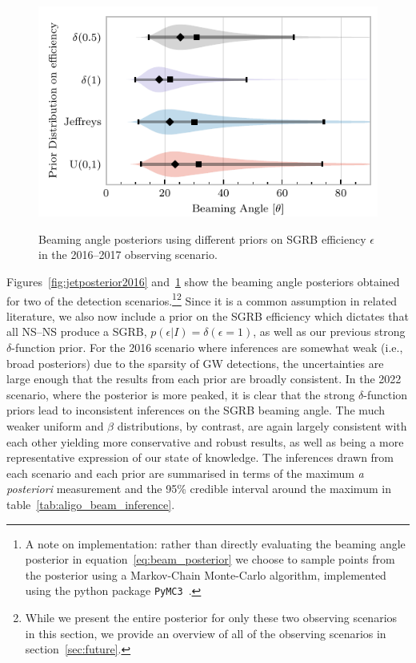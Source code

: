 \documentclass[twocolumn]{aastex61}
\newcommand{\BNS}{\ac{NS}--\ac{NS}\xspace}
\begin{document}
\begin{figure}
\centering
{\includegraphics[width=\linewidth]{O2_beaming_posteriors_violin.pdf}}
\caption{Beaming angle posteriors using different priors on \ac{SGRB} efficiency $\epsilon$ in the 2016--2017 observing scenario.
    \label{fig:jetposterior2022}}
\end{figure}

Figures~\ref{fig:jetposterior2016} and~\ref{fig:jetposterior2022} show
the beaming angle posteriors obtained for two of the detection
scenarios.\footnote{
    A note on implementation: rather than directly evaluating
    the beaming angle posterior in equation~\ref{eq:beam_posterior} we
    choose to sample points from the posterior using a Markov-Chain
    Monte-Carlo algorithm, implemented using the python package
    \texttt{PyMC3}~\cite{salvatier2016probabilistic}.
}\footnote{
    While we present the entire posterior for only these two
    observing scenarios in this section, we provide an overview of all
    of the observing scenarios in section~\ref{sec:future}.}
Since it is a common assumption in related literature, we also now include
a prior on the \ac{SGRB} efficiency which dictates that all \BNS produce a
\ac{SGRB}, $p(\epsilon|I)=\delta(\epsilon=1)$, as well as our previous
strong $\delta$-function prior.  For the 2016 scenario where
inferences are somewhat weak (i.e., broad posteriors) due to the
sparsity of \ac{GW} detections, the uncertainties are large enough
that the results from each prior are broadly consistent.  In the 2022
scenario, where the posterior is more peaked, it is clear that the
strong $\delta$-function priors lead to inconsistent inferences on the
\ac{SGRB} beaming angle.  The much weaker uniform and $\beta$
distributions, by contrast, are again largely consistent with each
other yielding more conservative and robust results, as well as being
a more representative expression of our state of knowledge.  The
inferences drawn from each scenario and each prior are summarised in
terms of the maximum \emph{a posteriori} measurement and the 95\%
credible interval around the maximum in
table~\ref{tab:aligo_beam_inference}.
\end{document}
